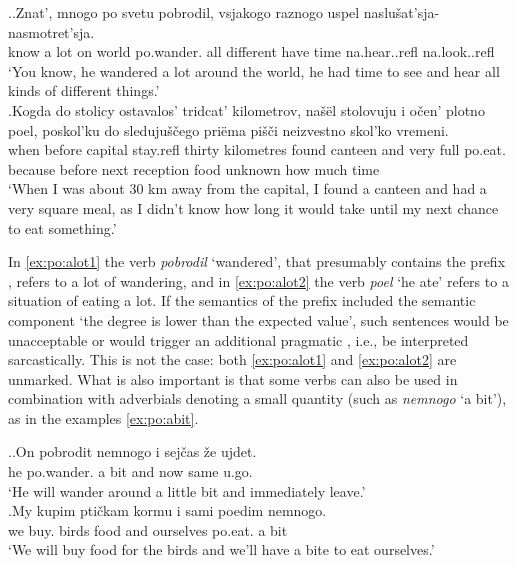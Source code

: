 \ex.\label{ex:po:alot}\ag.\label{ex:po:alot1}Znat', mnogo po svetu pobrodil, vsjakogo raznogo uspel {naslu\v{s}at'sja-} {nasmotret'sja.}\\
know {a lot} on world po.wander. all different {have time} na.hear..refl na.look..refl\\
\trans `You know, he wandered a lot around the world, he had time to see and hear all kinds of different things.'\\
\bg.\label{ex:po:alot2}Kogda do stolicy ostavalos' tridcat' kilometrov, na\v{s}\"{e}l stolovuju i o\v{c}en' plotno poel, poskol'ku do sleduju\v{s}\v{c}ego pri\"{e}ma pi\v{s}\v{c}i neizvestno skol'ko vremeni.\\
when before capital stay.refl thirty kilometres found canteen and very full po.eat. because before next reception food unknown {how much} time\\
\trans `When I was about 30 km away from the capital, I found a canteen and had a very square meal, as I didn't know how long it would take until my next chance to eat something.'\\

In \ref{ex:po:alot1} the verb \textit{pobrodil} `wandered', that presumably contains the  prefix , refers to a lot of wandering, and in \ref{ex:po:alot2} the verb \textit{poel} `he ate' refers to a situation of eating a lot. If the semantics of the  prefix  included the semantic component `the degree is lower than the expected value', such sentences would be unacceptable or would trigger an additional pragmatic , i.e., be interpreted sarcastically. This is not the case: both \ref{ex:po:alot1} and \ref{ex:po:alot2} are unmarked. What is also important is that some verbs can also be used in combination with adverbials denoting a small quantity (such as \textit{nemnogo} `a bit'), as in the examples \ref{ex:po:abit}.

\ex.\label{ex:po:abit}\ag.On pobrodit nemnogo i sej\v{c}as \v{z}e ujdet.\\
he po.wander. {a bit} and now same u.go.\\
\trans `He will wander around a little bit and immediately leave.'\\
\bg.My kupim pti\v{c}kam kormu i sami poedim nemnogo.\\
we buy. birds food and ourselves po.eat. {a bit}\\
\trans `We will buy food for the birds and we'll have a bite to eat ourselves.'\\


